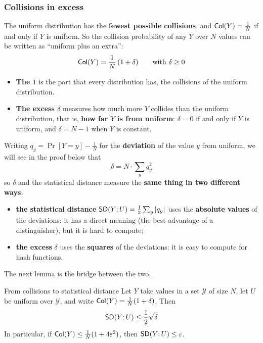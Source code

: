 \subsubsection{Collisions in excess}

The uniform distribution has the \textbf{fewest possible collisions}, and $\mathsf{Col}(Y) = \frac{1}{N}$ if and only if $Y$ is uniform. So the collision probability of any $Y$ over $N$ values can be written as ``uniform plus an extra'':
\[
  \mathsf{Col}(Y) = \frac{1}{N}\,(1 + \delta) \qquad \text{with } \delta \geq 0
\]
\begin{itemize}
  \item \textbf{The $1$} is the part that every distribution has, the collisions of the uniform distribution.
  \item \textbf{The excess $\delta$} measures how much more $Y$ collides than the uniform distribution, that is, \textbf{how far $Y$ is from uniform}: $\delta = 0$ if and only if $Y$ is uniform, and $\delta = N - 1$ when $Y$ is constant.
\end{itemize}

Writing $q_y = \Pr[Y = y] - \frac{1}{N}$ for the \textbf{deviation} of the value $y$ from uniform, we will see in the proof below that
\[
  \delta = N \cdot \sum_y q_y^2
\]
so $\delta$ and the statistical distance measure the \textbf{same thing in two different ways}:
\begin{itemize}
  \item \textbf{the statistical distance} $\mathsf{SD}(Y; U) = \frac{1}{2}\sum_y |q_y|$ uses the \textbf{absolute values} of the deviations: it has a direct meaning (the best advantage of a distinguisher), but it is hard to compute;
  \item \textbf{the excess} $\delta$ uses the \textbf{squares} of the deviations: it is easy to compute for hash functions.
\end{itemize}
The next lemma is the bridge between the two.

\begin{framedlem}[label={lem:col-sd}]{From collisions to statistical distance}
  Let $Y$ take values in a set $\mathcal{Y}$ of size $N$, let $U$ be uniform over $\mathcal{Y}$, and write $\mathsf{Col}(Y) = \frac{1}{N}(1 + \delta)$. Then
  \[
    \mathsf{SD}(Y; U) \leq \frac{1}{2}\sqrt{\delta}
  \]
  In particular, if $\mathsf{Col}(Y) \leq \frac{1}{N}(1 + 4\varepsilon^2)$, then $\mathsf{SD}(Y; U) \leq \varepsilon$.
\end{framedlem}

